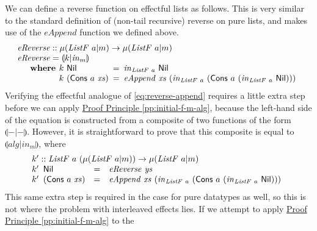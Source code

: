 \documentclass{jfp1}
\newcommand{\eFold}[2]{\llparenthesis #1|#2 \rrparenthesis}
\newcommand{\proofprinref}[1]{\hyperref[#1]{Proof Principle \ref*{#1}}}
\newcommand{\kw}[1]{\textbf{#1}}
\begin{document}
We can define a reverse function on effectful lists as follows. This
is very similar to the standard definition of (non-tail recursive)
reverse on pure lists, and makes use of the $\mathit{eAppend}$
function we defined above.
\begin{displaymath}
  \begin{array}{l}
    \mathit{eReverse} :: \mu(\mathit{ListF}~a|m) \to \mu(\mathit{ListF}~a|m) \\
    \mathit{eReverse} = \eFold{k}{\mathit{in}_m} \\
    \quad\begin{array}{r@{\hspace{0.4em}}l@{\hspace{0.5em}}c@{\hspace{0.5em}}l}
      \kw{where} & k~\mathsf{Nil} &=& \mathit{in}_{\mathit{ListF}~a}~\mathsf{Nil} \\
      & k~(\mathsf{Cons}~a~\mathit{xs}) &=& \mathit{eAppend}~\mathit{xs}~(\mathit{in}_{\mathit{ListF}~a}~(\mathsf{Cons}~a~(\mathit{in}_{\mathit{ListF}~a}~\mathsf{Nil})))
    \end{array}
  \end{array}
\end{displaymath}
Verifying the effectful analogue of \autoref{eq:reverse-append} requires a little extra step
before we can apply \proofprinref{pp:initial-f-m-alg}, because the
left-hand side of the equation is constructed from a composite of two
functions of the form $\eFold{-}{-}$. However, it is
straightforward to prove that this composite is equal to
$\eFold{\mathit{alg}}{\mathit{in}_m}$, where
\begin{displaymath}
  \begin{array}{l}
    k' :: \mathit{ListF}~a~(\mu(\mathit{ListF}~a|m)) \to \mu(\mathit{ListF}~a|m) \\
    \begin{array}{@{}l@{\hspace{0.5em}}lcl}
      k'&\mathsf{Nil} &=& \mathit{eReverse}~\mathit{ys} \\
      k'&(\mathsf{Cons}~a~\mathit{xs}) & =& \mathit{eAppend}~\mathit{xs}~(\mathit{in}_{\mathit{ListF}~a}~(\mathsf{Cons}~a~(\mathit{in}_{\mathit{ListF}~a}~\mathsf{Nil})))
    \end{array}
  \end{array}
\end{displaymath}
This same extra step is required in the case for pure datatypes as
well, so this is not where the problem with interleaved effects
lies. If we attempt to apply \proofprinref{pp:initial-f-m-alg} to the
\end{document}
